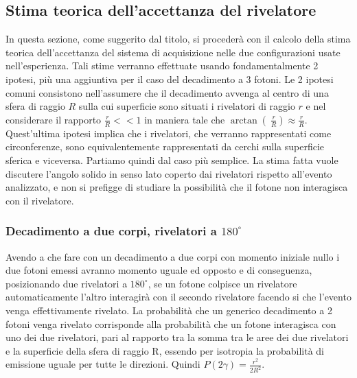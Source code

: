 \subsection{Stima teorica dell'accettanza del rivelatore}
  In questa sezione, come suggerito dal titolo, si procederà con il calcolo della stima teorica dell'accettanza del sistema di acquisizione nelle due configurazioni usate 
  nell'esperienza. Tali stime verranno effettuate usando fondamentalmente 2 ipotesi, più una aggiuntiva per il caso del decadimento a 3 fotoni. Le 2 ipotesi comuni consistono 
  nell'assumere che il decadimento avvenga al centro di una sfera di raggio \(R\) sulla cui superficie sono situati i rivelatori di raggio \(r\) e nel considerare il rapporto 
  \( \frac{r}{R} << 1 \) in maniera tale che \(\arctan\left(\ \frac{r}{R} \right) \approx \frac{r}{R} \). Quest'ultima ipotesi implica che i rivelatori, che verranno rappresentati come
  circonferenze, sono equivalentemente rappresentati da cerchi sulla superficie sferica e viceversa. Partiamo quindi dal caso più semplice. La stima fatta vuole
discutere l'angolo solido in senso lato coperto dai rivelatori rispetto all'evento analizzato, e non si prefigge di studiare la possibilità che il fotone non
interagisca con il rivelatore.
  \subsubsection{Decadimento a due corpi, rivelatori a \(180^\circ\)}
  Avendo a che fare con un decadimento a due corpi con momento iniziale nullo i due fotoni emessi avranno momento uguale ed opposto e di conseguenza, posizionando due rivelatori
  a \(180^\circ\), se un fotone colpisce un rivelatore automaticamente l'altro interagirà con il secondo rivelatore facendo si che l'evento venga effettivamente rivelato. La
  probabilità che un generico decadimento a 2 fotoni venga rivelato corrisponde alla probabilità che un fotone interagisca con  uno dei due rivelatori, pari al rapporto tra la 
  somma tra le aree dei due rivelatori e la superficie della sfera di raggio R, essendo per isotropia la probabilità di emissione uguale per tutte le direzioni. Quindi
  \(P\left(2\gamma\right) = \frac{r^2}{2R^2}\).
